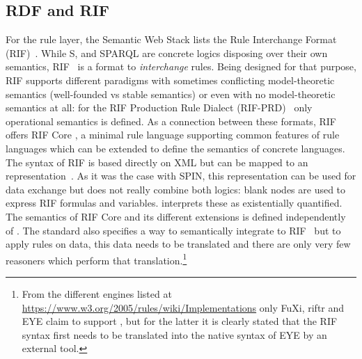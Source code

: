 \subsection{RDF and RIF}
For the rule layer, the Semantic Web Stack lists the Rule Interchange Format (RIF)~\cite{rif}.
While \rdf{}S, \owl and SPARQL are concrete logics disposing 
over their own semantics, RIF~\cite{rif} is a format to \emph{interchange} rules. 
Being designed for that purpose, RIF supports different paradigms with sometimes 
conflicting model-theoretic semantics (\eg well-founded vs stable semantics) or even with no model-theoretic semantics at all: 
for the RIF Production Rule Dialect (RIF-PRD)~\cite{rifprd} only operational semantics is defined. 
As a connection between these formats, RIF offers RIF Core \cite{rifcore}, a minimal rule language supporting common features of rule languages which can be 
extended to define the semantics of concrete languages.
The syntax of RIF is based directly on XML but can be mapped to an \rdf representation~\cite{rifinrdf}. 
As it was the case with SPIN, this representation can be used for data exchange but does not really combine both logics: 
blank nodes are used to express RIF formulas and variables. \rdf interprets these as existentially quantified.
The semantics of 
RIF Core and its different extensions is defined independently of \rdf. 
The standard also specifies a way to semantically integrate \rdf to RIF~\cite{rifrdf} but to apply rules on \rdf data, this data needs to be translated
and there are only very few reasoners which perform that translation.\footnote{From the different engines listed at \url{https://www.w3.org/2005/rules/wiki/Implementations}
only FuXi, riftr and EYE 
claim to support \rdf, but for the latter it is clearly stated that the RIF syntax first needs to be translated into the native syntax of EYE by an external tool. }
